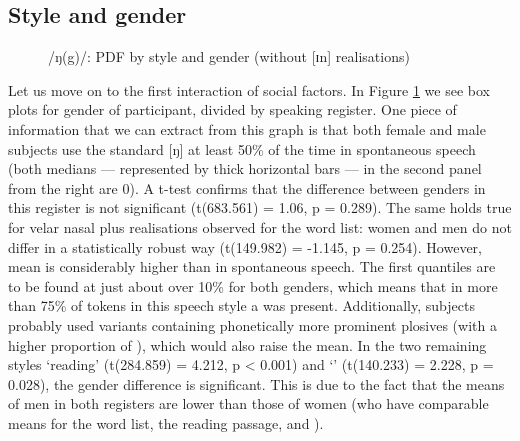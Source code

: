 \subsection{Style and gender}
\label{sec.prod.res.con.ng.stylegender}

\begin{figure}[h]
	\centering
		\resizebox{.49\linewidth}{!}{} 
	\caption{/ŋ(g)/: PDF by style and gender (without [ɪn] realisations)}
	\label{fig.box.ng.stylegender}
\end{figure}

Let us move on to the first interaction of social factors.
In Figure \ref{fig.box.ng.stylegender} we see box plots for gender of participant, divided by speaking register.
One piece of information that we can extract from this graph is that both female and male subjects use the standard [ŋ] at least 50\% of the time in spontaneous speech (both medians --- represented by thick horizontal bars --- in the second panel from the right are 0).
A t-test confirms that the difference between genders in this register is not significant (t(683.561) = 1.06, p = 0.289).
The same holds true for velar nasal plus realisations observed for the word list: women and men do not differ in a statistically robust way (t(149.982) = -1.145, p = 0.254).
However, mean  is considerably higher than in spontaneous speech.
The first quantiles are to be found at just about over 10\%  for both genders, which means that in more than 75\% of tokens in this speech style a  was present.
Additionally, subjects probably used variants containing phonetically more prominent plosives (with a higher proportion of ), which would also raise the mean.
In the two remaining styles `reading' (t(284.859) = 4.212, p < 0.001) and `' (t(140.233) = 2.228, p = 0.028), the gender difference is significant.
This is due to the fact that the means of men in both registers are lower than those of women (who have comparable means for the word list, the reading passage, and ).

